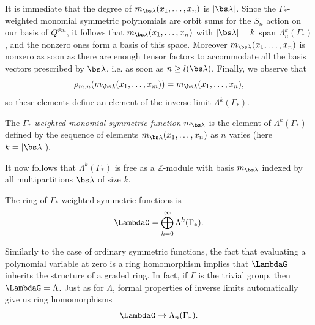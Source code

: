 It is immediate that the degree of $m_{\bs\lambda}(x_1, \ldots, x_n)$ is $|\bs\lambda|$. Since the $\Gamma_*$-weighted monomial symmetric polynomials are orbit sums for the $S_n$ action on our basis of $Q^{\otimes n}$, it follows that $m_{\bs\lambda}(x_1, \ldots, x_n)$ with $|\bs\lambda|=k$ span $\Lambda_{n}^k(\Gamma_*)$, and the nonzero ones form a basis of this space. Moreover $m_{\bs\lambda}(x_1, \ldots, x_n)$ is nonzero as soon as there are enough tensor factors to accommodate all the basis vectors prescribed by $\bs \lambda$, i.e. as soon as $n \geq l(\bs\lambda)$. Finally, we observe that
\[
\rho_{m,n}(m_{\bs\lambda}(x_1,\ldots, x_m)) = m_{\bs\lambda}(x_1,\ldots, x_n),
\]
so these elements define an element of the inverse limit $\Lambda^k(\Gamma_*)$.
\begin{definition}
The \emph{$\Gamma_*$-weighted monomial symmetric function} $m_{\bs\lambda}$ is the element of $\Lambda^k(\Gamma_*)$ defined by the sequence of elements $m_{\bs\lambda}(x_1, \dots, x_n)$ as $n$ varies \textup{(}here $k = |\bs\lambda|$\textup{)}.
\end{definition}

It now follows that $\Lambda^k(\Gamma_*)$ is free as a $\mathbb{Z}$-module with basis $m_{\bs\lambda}$ indexed by all multipartitions $\bs\lambda$ of size $k$.
\begin{definition}
The ring of $\Gamma_*$-weighted symmetric functions is
\[
\LambdaG = \bigoplus_{k=0}^{\infty} \Lambda^k(\Gamma_*).
\]
\end{definition}

Similarly to the case of ordinary symmetric functions, the fact that evaluating a polynomial variable at zero is a ring homomorphism implies that $\LambdaG$ inherits the structure of a graded ring. In fact, if $\Gamma$ is the trivial group, then $\LambdaG = \Lambda$. Just as for $\Lambda$, formal properties of inverse limits automatically give us ring homomorphisms
\[
\LambdaG \to \Lambda_n(\Gamma_*).
\]

